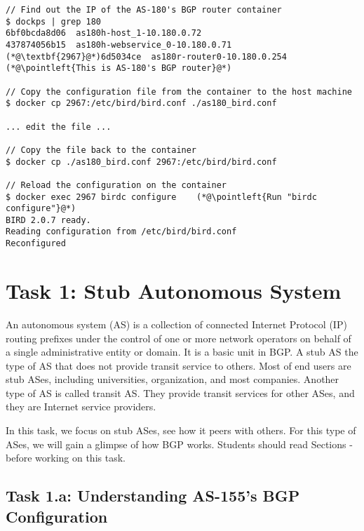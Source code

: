 \begin{lstlisting}
// Find out the IP of the AS-180's BGP router container
$ dockps | grep 180
6bf0bcda8d06  as180h-host_1-10.180.0.72
437874056b15  as180h-webservice_0-10.180.0.71
(*@\textbf{2967}@*)6d5034ce  as180r-router0-10.180.0.254     (*@\pointleft{This is AS-180's BGP router}@*) 

// Copy the configuration file from the container to the host machine
$ docker cp 2967:/etc/bird/bird.conf ./as180_bird.conf

... edit the file ...

// Copy the file back to the container 
$ docker cp ./as180_bird.conf 2967:/etc/bird/bird.conf 

// Reload the configuration on the container
$ docker exec 2967 birdc configure    (*@\pointleft{Run "birdc configure"}@*) 
BIRD 2.0.7 ready.
Reading configuration from /etc/bird/bird.conf
Reconfigured
\end{lstlisting}
 



\section{Task 1: Stub Autonomous System} 

An autonomous system (AS) is a collection of connected Internet Protocol (IP) routing prefixes
under the control of one or more network operators on behalf of a single administrative entity
or domain. It is a basic unit in BGP. 
A stub AS the type of AS that does not provide transit service to others.
Most of end users are stub ASes, including universities, organization,
and most companies. Another type of AS is called transit AS. They
provide transit services for other ASes, and they 
are Internet service providers.  

In this task, we focus on stub ASes, see how it peers with others. 
For this type of ASes, we will gain a glimpse of how BGP works. 
Students should read Sections \bgpintro - \bgpupdate 
before working on this task. 

\subsection{Task 1.a: Understanding AS-155's BGP Configuration} 

